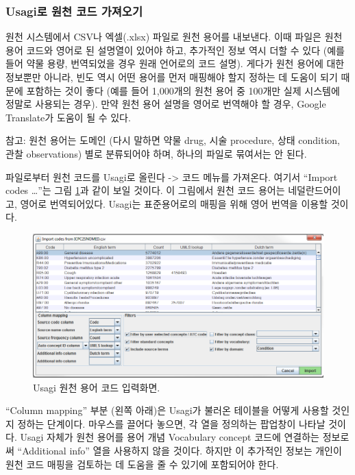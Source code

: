 \documentclass[10.5pt]{book}
\theoremstyle{definition}
\theoremstyle{definition}
\theoremstyle{definition}
\theoremstyle{remark}
\begin{document}
\subsubsection{Usagi로 원천 코드 가져오기}\label{usagi---}

원천 시스템에서 CSV나 엑셀(.xlsx) 파일로 원천 용어를 내보낸다. 이때
파일은 원천 용어 코드와 영어로 된 설명열이 있어야 하고, 추가적인 정보
역시 더할 수 있다 (예를 들어 약물 용량, 번역되었을 경우 원래 언어로의
코드 설명). 게다가 원천 용어에 대한 정보뿐만 아니라, 빈도 역시 어떤
용어를 먼저 매핑해야 할지 정하는 데 도움이 되기 때문에 포함하는 것이
좋다 (예를 들어 1,000개의 원천 용어 중 100개만 실제 시스템에 정말로
사용되는 경우). 만약 원천 용어 설명을 영어로 번역해야 할 경우, Google
Translate가 도움이 될 수 있다.

참고: 원천 용어는 도메인 (다시 말하면 약물 drug, 시술 procedure, 상태
condition, 관찰 observations) 별로 분류되어야 하며, 하나의 파일로
묶여서는 안 된다.

파일로부터 원천 코드를 Usagi로 올린다 -\textgreater{} 코드 메뉴를
가져온다. 여기서 ``Import codes \ldots{}''는 그림
\ref{fig:usagiImport}과 같이 보일 것이다. 이 그림에서 원천 코드 용어는
네덜란드어이고, 영어로 번역되어있다. Usagi는 표준용어로의 매핑을 위해
영어 번역을 이용할 것이다.

\begin{figure}

{\centering \includegraphics[width=1\linewidth]{images/ExtractTransformLoad/usagiImport} 

}

\caption{Usagi 원천 용어 코드 입력화면.}\label{fig:usagiImport}
\end{figure}

``Column mapping'' 부분 (왼쪽 아래)은 Usagi가 불러온 테이블을 어떻게
사용할 것인지 정하는 단계이다. 마우스를 끌어다 놓으면, 각 열을 정의하는
팝업창이 나타날 것이다. Usagi 자체가 원천 용어를 용어 개념 Vocabulary
concept 코드에 연결하는 정보로써 ``Additional info'' 열을 사용하지 않을
것이다. 하지만 이 추가적인 정보는 개인이 원천 코드 매핑을 검토하는 데
도움을 줄 수 있기에 포함되어야 한다.
\end{document}
